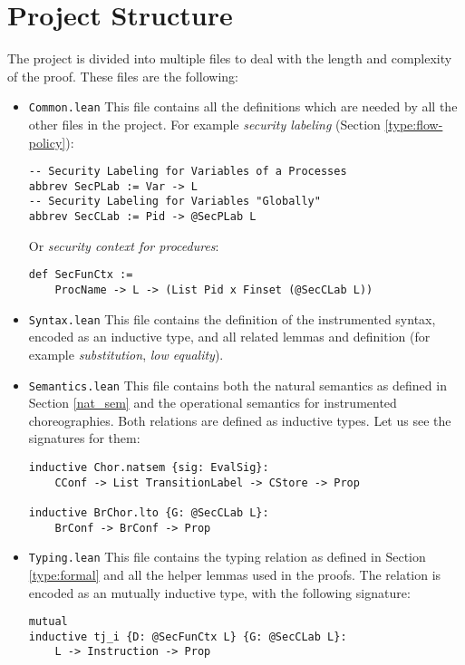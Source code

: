 \documentclass[12pt,a4paper,twoside]{book}
\begin{document}
\section{Project Structure}
The project is divided into multiple files to deal with the length and complexity of the proof. These files are the following:
\begin{itemize}
	\item \texttt{Common.lean} This file contains all the definitions which are needed by all the other files in the project. For example \emph{security labeling} (Section \ref{type:flow-policy}):
\begin{samepage}
\begin{verbatim}
-- Security Labeling for Variables of a Processes
abbrev SecPLab := Var -> L
-- Security Labeling for Variables "Globally"
abbrev SecCLab := Pid -> @SecPLab L
\end{verbatim}
\end{samepage}
Or \emph{security context for procedures}:
\begin{samepage}
\begin{verbatim}
def SecFunCtx :=
    ProcName -> L -> (List Pid x Finset (@SecCLab L))
\end{verbatim}
\end{samepage}

\item \texttt{Syntax.lean} This file contains the definition of the instrumented syntax, encoded as an inductive type, and all related lemmas and definition (for example \emph{substitution}, \emph{low equality}).

\item \texttt{Semantics.lean} This file contains both the natural semantics as defined in Section \ref{nat_sem} and the operational semantics for instrumented choreographies. Both relations are defined as inductive types. Let us see the signatures for them:
\begin{samepage}
\begin{verbatim}
inductive Chor.natsem {sig: EvalSig}:
    CConf -> List TransitionLabel -> CStore -> Prop

inductive BrChor.lto {G: @SecCLab L}:
    BrConf -> BrConf -> Prop
\end{verbatim}
\end{samepage}
\item \texttt{Typing.lean} This file contains the typing relation as defined in Section \ref{type:formal} and all the helper lemmas used in the proofs. The relation is encoded as an mutually inductive type, with the following signature:
\begin{samepage}
\begin{verbatim}
mutual
inductive tj_i {D: @SecFunCtx L} {G: @SecCLab L}:
    L -> Instruction -> Prop


\end{verbatim}
\end{samepage}
\end{itemize}
\end{document}
